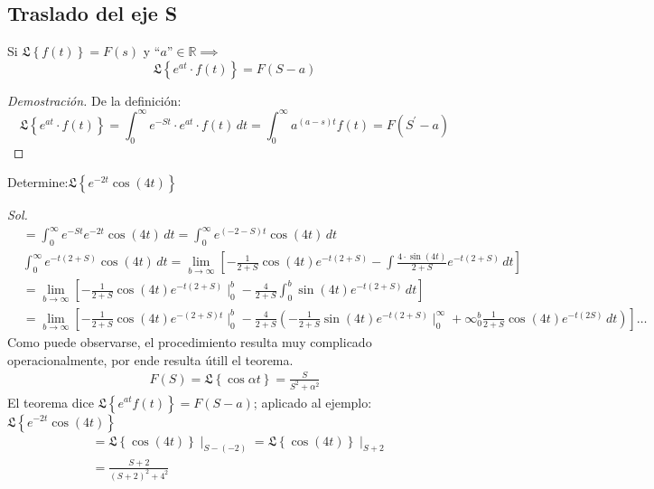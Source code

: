 \subsection{Traslado del eje S}
\begin{theorem}
    Si $\mathfrak{L}\left\{f(t)\right\}=F(s)$ y ``$a$''$\in\mathbb{R}\implies$ 
    \begin{equation}
        \mathfrak{L}\left\{e^{at}\cdot f(t)\right\} = F\left(S - a\right)
    \end{equation}
\end{theorem}
\begin{proof}[Demostración]
    De la definición:
    \begin{equation*}
        \mathfrak{L}\left\{e^{at}\cdot f(t)\right\} = \int_0^{\infty}e^{ - St}\cdot e^{at} \cdot f(t)\, dt =\int_0^{\infty} a^{(a- s)t}f(t) = F\left(S^{\prime} - a\right)
    \end{equation*}
\end{proof}
\begin{example}
    Determine:$\mathfrak{L}\left\{e^{-2t}\cos{(4t)}\right\}$
\end{example}
\textit{ Sol. }
\begin{align*}
    &=\int_0^{\infty}e^{ - St}e^{ - 2t}\cos{(4t)}\, dt = \int_0^{\infty}e^{ (-2-S)t} \cos{(4t)}\, dt\\
    &\int_0^{\infty}e^{ - t(2 + S)}\cos{(4t)}\, dt = \lim_{b \to \infty}\left[ - \frac{1}{2 + S}\cos{(4t)}e^{ - t(2 +S)} -\int \frac{4 \cdot \sin{(4t)} }{2 +S}e^{ -t(2 + S)}\, dt \right]\\
    &=\lim_{b\to \infty}\left[ - \frac{1}{2 + S}\cos{(4t)}e^{ - t(2 + S)}\mid_0^b - \frac{4}{2+ S}\int_0^b\sin{(4t)}e^{ - t(2 + S)}\, dt \right]\\
    &=\lim_{b\to \infty}\left[ - \frac{1}{2 + S}\cos{(4t)}e^{ -(2 +S)t}\mid_0^b - \frac{4}{2 + S}\left( - \frac{1}{2 + S}\sin {(4t)}e^{ - t(2 + S)}\mid_0^{\infty} +\infty_0^b \frac{1}{2 + S}\cos{(4t)}e^{ - t(2 S)}\, dt \right) \right]\dots
\end{align*}
Como puede observarse, el procedimiento resulta muy complicado operacionalmente, por ende resulta útill el teorema.
\begin{align*}
    F(S) =\mathfrak{L}\left\{\cos{\alpha t}\right\} = \frac{S}{S^2 +\alpha^2}
\end{align*}
El teorema dice $\mathfrak{L}\left\{e^{at}f(t)\right\}=F(S-a)$; aplicado al ejemplo:
$\mathfrak{L}\left\{e^{-2t}\cos{(4t)}\right\}$
\begin{align*}
    &=\mathfrak{L}\left\{\cos{(4t)} \right\}\mid_{S - (- 2)} = \mathfrak{L}\left\{\cos{(4t)} \right\}\mid_{S + 2}\\
    &= \frac{S + 2}{(S + 2)^2 + 4^2}
\end{align*}






